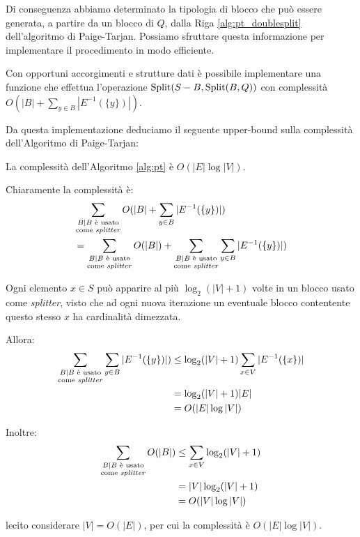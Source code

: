 Di conseguenza abbiamo determinato la tipologia di blocco che può essere generata, a partire da un blocco di $Q$, dalla Riga \ref{alg:pt_doublesplit} dell'algoritmo di Paige-Tarjan. Possiamo sfruttare questa informazione per implementare il procedimento in modo efficiente.

\begin{observation}
    Con opportuni accorgimenti e strutture dati \cite{paigetarjan} è possibile implementare una funzione che effettua l'operazione $\textup{Split}(S-B, \textup{Split}(B,Q))$ con complessità $O(|B| + \sum_{y \in B} |E^{-1}(\{y\})|)$.
\end{observation}

Da questa implementazione deduciamo il seguente upper-bound sulla complessità dell'Algoritmo di Paige-Tarjan:
\begin{theorem}
    La complessità dell'Algoritmo \ref{alg:pt} è $O(|E|\log |V|)$.
\end{theorem}
\begin{proof2}
    Chiaramente la complessità è:
    \begin{align*}
        \displaystyle &\sum_{\substack{B \mid B \text{ è usato}\\\text{come \emph{splitter}}}} O(|B| + \sum_{y \in B} |E^{-1}(\{y\})|)\\
        &= \sum_{\substack{B \mid B \text{ è usato}\\\text{come \emph{splitter}}}} O(|B|) + \sum_{\substack{B \mid B \text{ è usato}\\\text{come \emph{splitter}}}} \sum_{y \in B} |E^{-1}(\{y\})|)
    \end{align*}

    \begin{observation}
        Ogni elemento $x \in S$ può apparire al più $\log_2 (|V| + 1)$ volte in un blocco usato come \emph{splitter}, visto che ad ogni nuova iterazione un eventuale blocco contentente questo stesso $x$ ha cardinalità dimezzata.
    \end{observation}

    Allora:
    \begin{align*}
        \sum_{\substack{B \mid B \text{ è usato}\\\text{come \emph{splitter}}}} \sum_{y \in B} |E^{-1}(\{y\})|) &\leq \log_2 (|V|+1) \sum_{x \in V} |E^{-1}(\{x\})|\\
        &= \log_2 (|V|+1) |E|\\
        &= O(|E|\log |V|)
    \end{align*}

    Inoltre:
    \begin{align*}
        \sum_{\substack{B \mid B \text{ è usato}\\\text{come \emph{splitter}}}} O(|B|) &\leq \sum_{x \in V} \log_{2} (|V|+1)\\
        &= |V|\log_{2} (|V|+1)\\
        &= O(|V|\log |V|)
    \end{align*}

    \accente lecito considerare $|V| = O(|E|)$, per cui la complessità è $O(|E| \log |V|)$.
\end{proof2}
